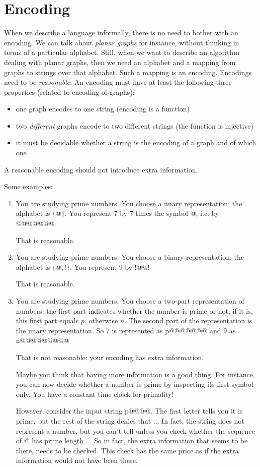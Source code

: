 \section{Encoding}

When we describe a language informally, there is no need to bother
with an encoding. We can talk about {\em planar graphs} for instance,
without thinking in terms of a particular alphabet. Still, when we
want to describe an algorithm dealing with planar graphs, then we need
an alphabet and a mapping from graphs to strings over that alphabet.
Such a mapping is an encoding. Encodings need to be {\em
  reasonable}. An encoding must have at least the following three
properties (related to encoding of graphs):
\begin{itemize}
\item one graph encodes to one string (encoding is a function)
\item two {\em different} graphs encode to two different strings (the function is injective)
\item it must be decidable whether a string is the encoding of a graph
  and of which one
\end{itemize}
A reasonable encoding should not introduce extra information.

Some examples:
\begin{enumerate}
\item
You are studying prime numbers. You choose a unary representation: the
alphabet is $\{@\}$. You represent 7 by 7 times the symbol @, i.e. by
@@@@@@@

That is reasonable.

\item
You are studying prime numbers. You choose a binary representation: the
alphabet is $\{@,!\}$. You represent 9 by !@@!

That is reasonable.


\item
You are studying prime numbers. You choose a two-part representation of
numbers: the first part indicates whether the number is prime or not;
if it is, this first part equals $p$, otherwise $n$. The second part
of the representation is the unary representation. So 7 is
represented as p@@@@@@@ and 9 as n@@@@@@@@@

That is not reasonable: your encoding has extra information.

Maybe you think that having more information is a good thing. For instance,
you can now decide whether a number is prime by inspecting its first
symbol only. You have a constant time check for primality!

However, consider the input string p@@@@. The first letter tells you
it is prime, but the rest of the string denies that ... In fact, the
string does not represent a number, but you can't tell unless you
check whether the sequence of @ has prime length ... So in fact, the
extra information that seems to be there, needs to be checked. This
check has the same price as if the extra information would not have
been there.

\end{enumerate}


